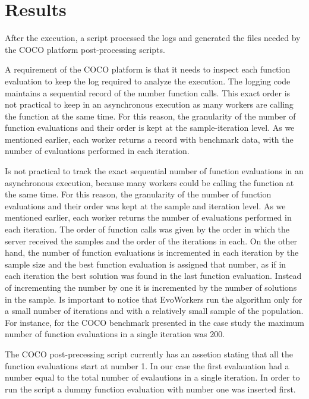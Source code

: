 \documentclass[sigconf]{acmart}
\begin{document}
\section{Results}

After the  execution, a script processed the logs and 
generated the files needed by the COCO platform post-processing scripts. 

A requirement of the COCO platform is that it needs 
to inspect each function evaluation to keep the log required 
to analyze the execution. The logging code maintains 
a sequential record of the number function calls. 
This exact order is not practical to keep in an asynchronous 
execution as many workers are calling the function at the 
same time. For this reason, the granularity of the number of 
function evaluations and their order is kept at the 
sample-iteration level. As we mentioned earlier, each worker 
returns a record with benchmark data, with the number of 
evaluations performed in each iteration.

Is not practical to track the exact sequential 
number of function evaluations in an asynchronous 
execution, because many workers could be calling 
the function at the same time. For this reason, the 
granularity of the number of function evaluations and 
their order was kept at the sample and iteration level. 
As we mentioned earlier, each worker returns the number 
of evaluations performed in each iteration. The order 
of function calls was given by the order in which the 
server received the samples and the order of the 
iterations in each. On the other hand, the number of 
function evaluations is incremented in each iteration 
by the sample size and the best function evaluation is 
assigned that number,  as if in each iteration the best 
solution was found in the last function evaluation. Instead 
of incrementing the number by one it is incremented by the 
number of solutions in the sample. 
Is important to notice that EvoWorkers run the algorithm 
only for a small number of iterations and with 
a relatively small sample of the population. For instance,
for the COCO benchmark presented in the case study the maximum number of 
function evaluations in a single iteration was 200.

The COCO post-precessing script currently has an assetion stating
that all the function evaluations start at number 1. In our
case the first evalauation had a number equal to the total number
of evalautions in a single iteration. In order to run the script 
a dummy function evaluation with number one was inserted first. 
\end{document}
